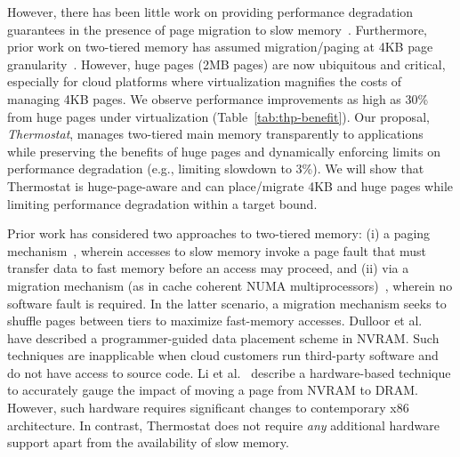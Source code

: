 However, there has been little work on providing performance degradation
guarantees in the presence of page migration to slow
memory~\cite{li2015managing}. 
Furthermore, prior work on two-tiered memory has assumed migration/paging at 4KB
page granularity~\cite{qureshi:twolm,ref:Dulloor:datatiering}. However,
huge pages (2MB pages) are now ubiquitous and critical, especially for cloud
platforms where virtualization magnifies the costs of managing 4KB pages.
We observe performance improvements as high as 30\% from huge pages under
virtualization (Table~\ref{tab:thp-benefit}).
Our proposal, {\it Thermostat}, manages two-tiered main memory
transparently to applications while preserving the benefits of huge pages 
and dynamically enforcing limits on performance degradation (e.g., limiting 
slowdown to 3\%).
We will show that Thermostat is huge-page-aware and can
place/migrate 4KB and huge pages while limiting
performance degradation within a target bound.

Prior work has considered two approaches to two-tiered memory: (i) a paging
mechanism~\cite{Lim2012,Lim2009}, wherein accesses to slow memory invoke a page
fault that must transfer data to fast memory before an access may proceed, and
(ii)
via a migration mechanism (as in cache coherent NUMA
multiprocessors)~\cite{AUTONUMA}, wherein no software fault is required.  In the
latter scenario, a migration mechanism seeks to shuffle pages between tiers to
maximize fast-memory accesses. Dulloor et al.~\cite{ref:Dulloor:datatiering}
have described a programmer-guided data placement scheme in NVRAM. Such
techniques are inapplicable when cloud customers run third-party software and do not have access to source code.
Li et al.~\cite{li2015managing} describe a
hardware-based technique to accurately gauge the impact of moving a page from
NVRAM to DRAM. However, such hardware requires significant changes to
contemporary x86 architecture.  In contrast, Thermostat does not require {\it any} additional hardware support
apart from the availability of slow memory.

